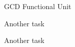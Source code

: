 
\section[{\it Hands-On} GCD Unit]{}

\begin{frame}{GCD Functional Unit}
\end{frame}

\begin{task}
\begin{frame}{Another task}

\end{frame}
\end{task}

\begin{task}
\begin{frame}{Another task}

\end{frame}
\end{task}


